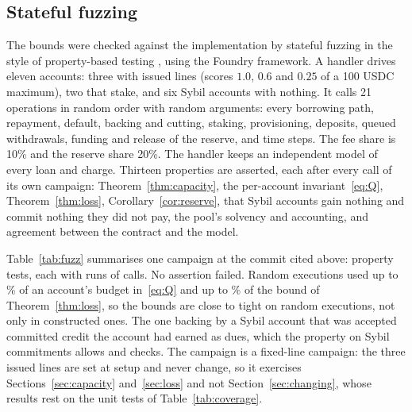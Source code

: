 \documentclass[acmsmall,nonacm,screen]{acmart}
\theoremstyle{acmdefinition}%
\begin{document}
\subsection{Stateful fuzzing}\label{sec:fuzz}

The bounds were checked against the implementation by stateful fuzzing in the style of
property-based testing \citep{claessen2000quickcheck}, using the Foundry framework. A handler
drives eleven accounts: three with issued lines (scores $1.0$, $0.6$ and $0.25$ of a 100 USDC
maximum), two that stake, and six Sybil accounts with nothing. It calls 21 operations in random
order with random arguments: every borrowing path, repayment, default, backing and cutting,
staking, provisioning, deposits, queued withdrawals, funding and release of the reserve, and time
steps. The fee share is 10\% and the reserve share 20\%. The handler keeps an independent model of
every loan and charge. Thirteen properties are asserted, each after every call of its own campaign:
Theorem~\ref{thm:capacity}, the per-account invariant~\eqref{eq:Q}, Theorem~\ref{thm:loss},
Corollary~\ref{cor:reserve}, that Sybil accounts gain nothing and commit nothing they did not pay,
the pool's solvency and accounting, and agreement between the contract and the model.

Table~\ref{tab:fuzz} summarises one campaign at the commit cited above: \FuzzTests{} property
tests, each with \FuzzRunsPerTest{} runs of \FuzzDepth{} calls. No assertion failed. Random
executions used up to \FuzzMaxQ\% of an account's budget in~\eqref{eq:Q} and up to \FuzzMaxI\% of
the bound of Theorem~\ref{thm:loss}, so the bounds are close to tight on random executions, not
only in constructed ones. The one backing by a Sybil account that was accepted committed credit the
account had earned as dues, which the property on Sybil commitments allows and checks. The campaign
is a fixed-line campaign: the three issued lines are set at setup and never change, so it exercises
Sections~\ref{sec:capacity} and~\ref{sec:loss} and not Section~\ref{sec:changing}, whose results rest
on the unit tests of Table~\ref{tab:coverage}.
\end{document}
